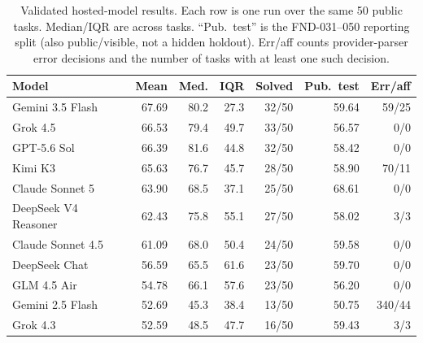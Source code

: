 \begin{table}[t]
\caption{Validated hosted-model results. Each row is one run over the same 50 public tasks. Median/IQR are across tasks. ``Pub.\ test'' is the FND-031--050 reporting split (also public/visible, not a hidden holdout). Err/aff counts provider-parser error decisions and the number of tasks with at least one such decision.}
\label{tab:models}
\centering\scriptsize
\begin{tabular}{lrrrrrr}
\toprule
Model & Mean & Med. & IQR & Solved & Pub.\ test & Err/aff \\
\midrule
Gemini 3.5 Flash & 67.69 & 80.2 & 27.3 & 32/50 & 59.64 & 59/25 \\
Grok 4.5 & 66.53 & 79.4 & 49.7 & 33/50 & 56.57 & 0/0 \\
GPT-5.6 Sol & 66.39 & 81.6 & 44.8 & 32/50 & 58.42 & 0/0 \\
Kimi K3 & 65.63 & 76.7 & 45.7 & 28/50 & 58.90 & 70/11 \\
Claude Sonnet 5 & 63.90 & 68.5 & 37.1 & 25/50 & 68.61 & 0/0 \\
DeepSeek V4 Reasoner & 62.43 & 75.8 & 55.1 & 27/50 & 58.02 & 3/3 \\
Claude Sonnet 4.5 & 61.09 & 68.0 & 50.4 & 24/50 & 59.58 & 0/0 \\
DeepSeek Chat & 56.59 & 65.5 & 61.6 & 23/50 & 59.70 & 0/0 \\
GLM 4.5 Air & 54.78 & 66.1 & 57.6 & 23/50 & 56.20 & 0/0 \\
Gemini 2.5 Flash & 52.69 & 45.3 & 38.4 & 13/50 & 50.75 & 340/44 \\
Grok 4.3 & 52.59 & 48.5 & 47.7 & 16/50 & 59.43 & 3/3 \\
\bottomrule
\end{tabular}
\end{table}
